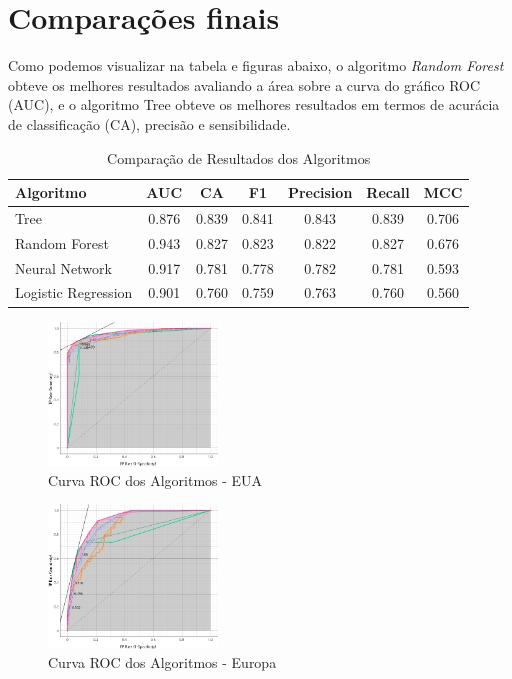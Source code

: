 \documentclass[conference]{IEEEtran}
\begin{document}
\section{Comparações finais}
Como podemos visualizar na tabela e figuras abaixo, o algoritmo \textit{Random Forest} obteve os melhores resultados avaliando a área sobre
a curva do gráfico ROC (AUC), e o algoritmo Tree obteve os melhores resultados em termos de acurácia de classificação (CA), precisão e sensibilidade.
\begin{table}[!ht]
	\centering
	\begin{tabular}{lcccccc}
		\toprule
		\textbf{Algoritmo}  & \textbf{AUC} & \textbf{CA} & \textbf{F1} & \textbf{Precision} & \textbf{Recall} & \textbf{MCC} \\
		\midrule
		Tree                & 0.876        & 0.839       & 0.841       & 0.843              & 0.839           & 0.706        \\
		Random Forest       & 0.943        & 0.827       & 0.823       & 0.822              & 0.827           & 0.676        \\
		Neural Network      & 0.917        & 0.781       & 0.778       & 0.782              & 0.781           & 0.593        \\
		Logistic Regression & 0.901        & 0.760       & 0.759       & 0.763              & 0.760           & 0.560        \\
		\bottomrule
	\end{tabular}
	\label{tab:evaluation_results}
	\caption{Comparação de Resultados dos Algoritmos}
\end{table}

\begin{figure}[!ht]
	\centering
	\includegraphics[width=0.4\textwidth]{Resources/ROC_EUA.png}
	\caption{Curva ROC dos Algoritmos - EUA}
\end{figure}

\begin{figure}[!ht]
	\centering
	\includegraphics[width=0.4\textwidth]{Resources/ROC_EU.png}
	\caption{Curva ROC dos Algoritmos - Europa}
\end{figure}
\end{document}
